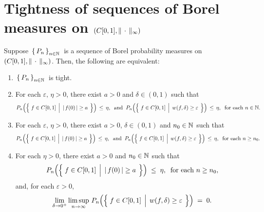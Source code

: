 

\section{Tightness of sequences of Borel measures on $\left(C[0,1],\Vert\,\cdot\,\Vert_{\infty}\right)$}
\setcounter{theorem}{0}
\setcounter{equation}{0}

\renewcommand{\theenumi}{\roman{enumi}}
\renewcommand{\labelenumi}{\textnormal{(\theenumi)}$\;\;$}

\begin{theorem}
\label{NecessarySufficientTightnessCzo}
\mbox{}\vskip 0.1cm
\noindent
Suppose \,$\left\{\,P_{n}\,\right\}_{n\in\mathbb{N}}$\, is a sequence of Borel probability measures on
$\left(C[0,1],\Vert\,\cdot\,\Vert_{\infty}\right)$.
\vskip0.1cm
\noindent
Then, the following are equivalent:
\begin{enumerate}
\item	\,$\left\{\,P_{n}\,\right\}_{n\in\mathbb{N}}$\, is tight.
\item	For each $\varepsilon,\,\eta > 0$, there exist $a > 0$ and $\delta \in (0,1)$ such that
		\begin{equation*}
		P_{n}\!\left(\left\{\;
			f \in \Czo
			\;\left\vert\;\,
			\vert\,f(0)\,\vert \overset{{\color{white}.}}{\geq} a
			\right.
		\;\right\}\right)
		\,\leq\, \eta,
		\;\;\textnormal{and}\;\;
		P_{n}\!\left(\left\{\;
			f \in \Czo
			\;\left\vert\;\,
			w(f,\delta) \overset{{\color{white}.}}{\geq} \varepsilon
			\right.
		\;\right\}\right)
		\,\leq\, \eta,
		\;\;
		\textnormal{for each $n \in \N$}.
		\end{equation*}
\item	For each $\varepsilon,\,\eta > 0$, there exist $a > 0$, $\delta \in (0,1)$ and $n_{0} \in \mathbb{N}$ such that
		\begin{equation*}
		P_{n}\!\left(\left\{\;
			f \in \Czo
			\;\left\vert\;\,
			\vert\,f(0)\,\vert \overset{{\color{white}.}}{\geq} a
			\right.
		\;\right\}\right)
		\,\leq\, \eta,
		\;\;\textnormal{and}\;\;
		P_{n}\!\left(\left\{\;
			f \in \Czo
			\;\left\vert\;\,
			w(f,\delta) \overset{{\color{white}.}}{\geq} \varepsilon
			\right.
		\;\right\}\right)
		\,\leq\, \eta,
		\;\;
		\textnormal{for each $n \geq n_{0}$}.
		\end{equation*}
\item	For each $\eta > 0$, there exist $a > 0$ and $n_{0} \in \mathbb{N}$ such that
		\begin{equation*}
		P_{n}\!\left(\left\{\;
			f \in \Czo
			\;\left\vert\;\,
			\vert\,f(0)\,\vert \overset{{\color{white}.}}{\geq} a
			\right.
		\;\right\}\right)
		\;\leq\; \eta,
		\;\;\textnormal{for each $n \geq n_{0}$},
		\end{equation*}
		and, for each $\varepsilon > 0$,
		\begin{equation*}
		\lim_{\delta\rightarrow 0^{+}}
		\limsup_{n\rightarrow\infty}\,
		P_{n}\!\left(\left\{\;
			f \in \Czo
			\;\left\vert\;\,
			w(f,\delta) \overset{{\color{white}.}}{\geq} \varepsilon
			\right.
		\;\right\}\right)
		\;=\; 0.		
		\end{equation*}
\end{enumerate}
\end{theorem}
